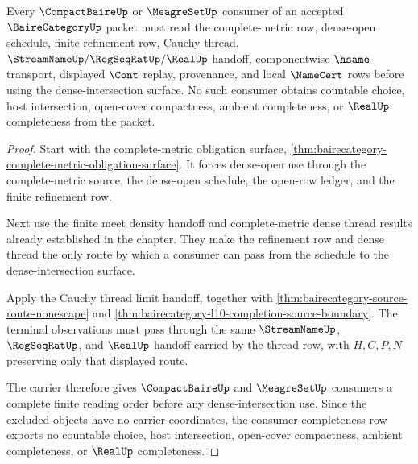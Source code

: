 \begin{theorem}
\label{thm:baire-category-mature-consumer-completeness}
Every $\CompactBaireUp$ or $\MeagreSetUp$ consumer of an accepted $\BaireCategoryUp$ packet must read the complete-metric row, dense-open schedule, finite refinement row, Cauchy thread, $\StreamNameUp/\RegSeqRatUp/\RealUp$ handoff, componentwise $\hsame$ transport, displayed $\Cont$ replay, provenance, and local $\NameCert$ rows before using the dense-intersection surface. No such consumer obtains countable choice, host intersection, open-cover compactness, ambient completeness, or $\RealUp$ completeness from the packet.
\end{theorem}
\begin{proof}
Start with the complete-metric obligation surface, \autoref{thm:bairecategory-complete-metric-obligation-surface}. It forces dense-open use through the complete-metric source, the dense-open schedule, the open-row ledger, and the finite refinement row.

Next use the finite meet density handoff and complete-metric dense thread results already established in the chapter. They make the refinement row and dense thread the only route by which a consumer can pass from the schedule to the dense-intersection surface.

Apply the Cauchy thread limit handoff, together with \autoref{thm:bairecategory-source-route-nonescape} and \autoref{thm:bairecategory-l10-completion-source-boundary}. The terminal observations must pass through the same $\StreamNameUp$, $\RegSeqRatUp$, and $\RealUp$ handoff carried by the thread row, with $H,C,P,N$ preserving only that displayed route.

The carrier therefore gives $\CompactBaireUp$ and $\MeagreSetUp$ consumers a complete finite reading order before any dense-intersection use. Since the excluded objects have no carrier coordinates, the consumer-completeness row exports no countable choice, host intersection, open-cover compactness, ambient completeness, or $\RealUp$ completeness.
\end{proof}

